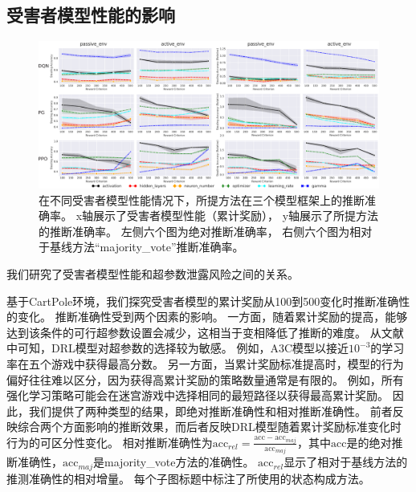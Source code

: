 \subsection{受害者模型性能的影响}
\label{sec:impact of model reward}
\begin{figure}
    \centering
    \includegraphics[width=\hsize]{figure/drl_hypertheif/agent_reward/agent_reward.pdf}
    \caption{
    在不同受害者模型性能情况下，所提方法在三个模型框架上的推断准确率。
    x轴展示了受害者模型性能（累计奖励），
    y轴展示了所提方法的推断准确率。
    左侧六个图为绝对推断准确率，
    右侧六个图为相对于基线方法“majority\_vote”推断准确率。
    } 
    \label{fig:impact of model reward}
\end{figure}
我们研究了受害者模型性能和超参数泄露风险之间的关系。

基于CartPole环境，我们探究受害者模型的累计奖励从100到500变化时\sysname 推断准确性的变化。
推断准确性受到两个因素的影响。
一方面，随着累计奖励的提高，能够达到该条件的可行超参数设置会减少，这相当于变相降低了推断的难度。
从文献{\rm\parencite{MBMGLHSK16}}中可知，DRL模型对超参数的选择较为敏感。
例如，A3C模型以接近$10^{-3}$的学习率在五个游戏中获得最高分数\cite{MBMGLHSK16}。
另一方面，当累计奖励标准提高时，模型的行为偏好往往难以区分，因为获得高累计奖励的策略数量通常是有限的。
例如，所有强化学习策略可能会在迷宫游戏中选择相同的最短路径以获得最高累计奖励。
因此，我们提供了两种类型的结果，即绝对推断准确性和相对推断准确性。
前者反映综合两个方面影响的推断效果，而后者反映DRL模型随着累计奖励标准变化时行为的可区分性变化。
相对推断准确性为$\text{acc}_{rel}=\frac{\text{acc} - \text{acc}_{maj}}{\text{acc}_{maj}}$，其中$\text{acc}$是\sysname 的绝对推断准确性，$\text{acc}_{maj}$是majority\_vote方法的准确性。
$\text{acc}_{rel}$显示了相对于基线方法的\sysname 推测准确性的相对增量。
每个子图标题中标注了所使用的状态构成方法。

